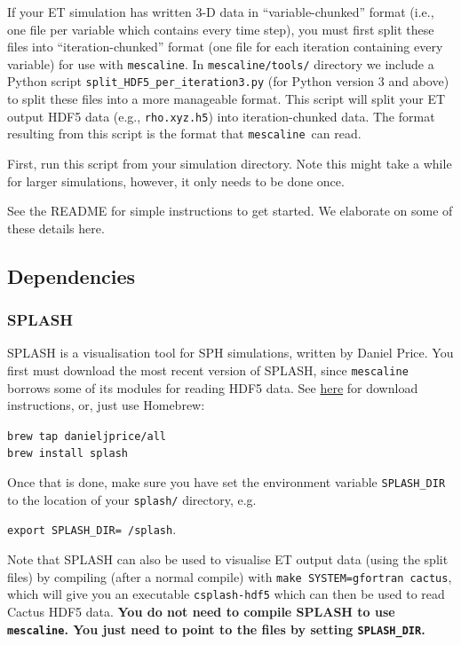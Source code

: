 \documentclass[a4paper]{article}
\newcommand{\mesc}{\texttt{mescaline}}
\begin{document}
If your ET simulation has written 3-D data in ``variable-chunked'' format (i.e., one file per variable which contains every time step), you must first split these files into ``iteration-chunked'' format (one file for each iteration containing every variable) for use with \mesc.
In \mesc\texttt{/tools/} directory we include a Python script \texttt{split\_HDF5\_per\_iteration3.py} (for Python version 3 and above) to split these files into a more manageable format. This script will split your ET output HDF5 data (e.g., \texttt{rho.xyz.h5}) into iteration-chunked data. The format resulting from this script is the format that \mesc\ can read.

First, run this script from your simulation directory. Note this might take a while for larger simulations, however, it only needs to be done once. 

See the README for simple instructions to get started. We elaborate on some of these details here. 
\subsection{Dependencies}

\subsubsection{SPLASH}

SPLASH is a visualisation tool for SPH simulations, written by Daniel Price. You first must download the most recent version of SPLASH, since \mesc\, borrows some of its modules for reading HDF5 data. See \href{http://users.monash.edu.au/~dprice/splash/}{here} for download instructions, or, just use Homebrew:

\vspace{2mm}
\texttt{brew tap danieljprice/all} \\

\texttt{brew install splash}
\vspace{2mm}

Once that is done, make sure you have set the environment variable \texttt{SPLASH\_DIR} to the location of your \texttt{splash/} directory, e.g. 

\vspace{2mm}
\texttt{export SPLASH\_DIR=~/splash}.
\vspace{2mm}

Note that SPLASH can also be used to visualise ET output data (using the split files) by compiling (after a normal compile) with \texttt{make SYSTEM=gfortran cactus}, which will give you an executable \texttt{csplash-hdf5} which can then be used to read Cactus HDF5 data. {\bf You do not need to compile SPLASH to use \mesc. You just need to point to the files by setting \texttt{SPLASH\_DIR}.}
\end{document}
